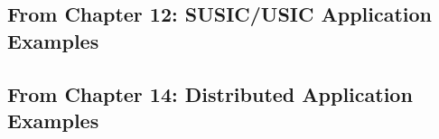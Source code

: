 \subsection{From Chapter 12: SUSIC/USIC Application Examples}



\subsection{From Chapter 14: Distributed Application Examples}




